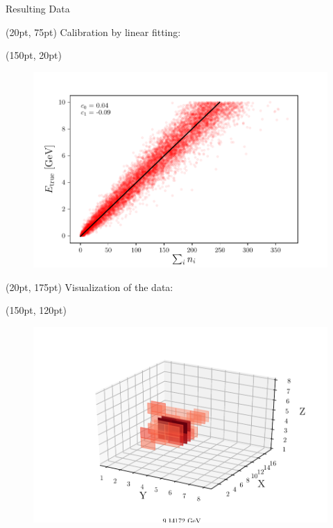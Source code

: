 \documentclass[10pt]{beamer}
\begin{document}
\begin{frame}{Resulting Data}
    \begin{textblock*}{250pt}(20pt, 75pt)
    Calibration by linear fitting:
  \end{textblock*}
  \begin{textblock*}{150pt}(150pt, 20pt)
    \begin{figure}[htp]
      \includegraphics[width=\textwidth]{../images/e-vs-sum_n_fit.png}
    \end{figure}
  \end{textblock*}
  \begin{textblock*}{250pt}(20pt, 175pt)
    Visualization of the data:
  \end{textblock*}
  \begin{textblock*}{135pt}(150pt, 120pt)
    \begin{figure}[htp]
      \includegraphics[width=1.1\textwidth]{../images/data_display.png}
    \end{figure}
  \end{textblock*}
\end{frame}
\end{document}
